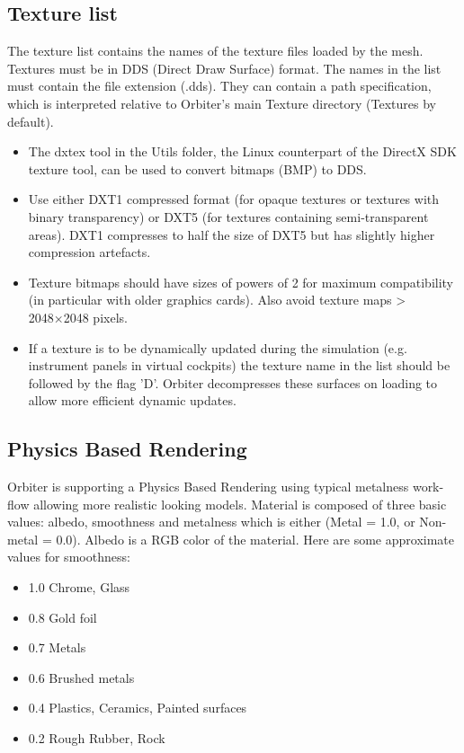 \documentclass[Orbiter Developer Manual.tex]{subfiles}
\begin{document}
\subsection{Texture list}
The texture list contains the names of the texture files loaded by the mesh. Textures must be in DDS (Direct Draw Surface) format. The names in the list must contain the file extension (.dds). They can contain a path specification, which is interpreted relative to Orbiter's main Texture directory (Textures by default).

\begin{itemize}
\item The dxtex tool in the Utils folder, the Linux counterpart of the DirectX SDK texture tool, can be used to convert bitmaps (BMP) to DDS.
\item Use either DXT1 compressed format (for opaque textures or textures with binary transparency) or DXT5 (for textures containing semi-transparent areas). DXT1 compresses to half the size of DXT5 but has slightly higher compression artefacts.
\item Texture bitmaps should have sizes of powers of 2 for maximum compatibility (in particular with older graphics cards). Also avoid texture maps > 2048×2048 pixels.
\item If a texture is to be dynamically updated during the simulation (e.g. instrument panels in virtual cockpits) the texture name in the list should be followed by the flag 'D'. Orbiter decompresses these surfaces on loading to allow more efficient dynamic updates.
\end{itemize}

\subsection{Physics Based Rendering}
Orbiter is supporting a Physics Based Rendering using typical metalness work-flow allowing more realistic looking models. Material is composed of three basic values: albedo, smoothness and metalness which is either (Metal = 1.0, or Non-metal = 0.0). Albedo is a RGB color of the material. Here are some approximate values for smoothness:

\begin{itemize}
\item	1.0 Chrome, Glass
\item	0.8 Gold foil
\item	0.7 Metals
\item 0.6 Brushed metals
\item	0.4 Plastics, Ceramics, Painted surfaces
\item	0.2 Rough Rubber, Rock
\end{itemize}
\break
\end{document}
